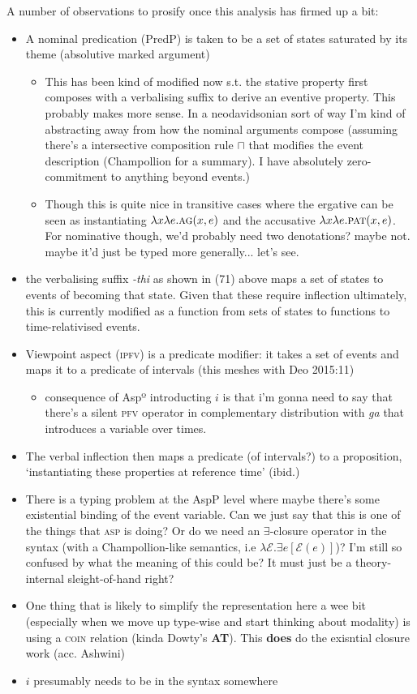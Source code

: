\documentclass[11pt,dvipsnames]{report}
\begin{document}
A number of observations to prosify once this analysis has firmed up a bit:
\begin{itemize}
	\item A nominal predication (PredP) is taken to be a set of states saturated by its theme (absolutive marked argument)
	\begin{itemize}
		\item This has been kind of modified now s.t. the stative property first composes with a verbalising suffix to derive an eventive property.  This probably makes more sense. In a neodavidsonian sort of way I'm kind of abstracting away from how the nominal arguments compose (assuming there's a intersective composition rule $ \boldsymbol\sqcap $ that modifies the event description (Champollion for a summary). I have absolutely zero-commitment to anything beyond events.)
		\item Though this is quite nice in transitive cases where the ergative can be seen as instantiating $ \lambda x\lambda e.\textsc{ag}(x,e) $ and the accusative $ \lambda x\lambda e.\textsc{pat}(x,e) $. For nominative though, we'd probably need two denotations? maybe not. maybe it'd just be typed more generally... let's see.
	\end{itemize}
	\item the verbalising suffix \textit{-thi} as shown in (71) above maps a set of states to events of becoming that state. Given that these require inflection ultimately, this is currently modified as a function from sets of states to functions to time-relativised events.
	\item Viewpoint aspect (\textsc{ipfv}) is a predicate modifier: it takes a set of events and maps it to a predicate of intervals (this meshes with Deo 2015:11)
	\begin{itemize}
		\item consequence of Aspº introducting $ i $ is that i'm gonna need to say that there's a silent \textsc{pfv} operator in complementary distribution with \textit{ga} that introduces a variable over times.
	\end{itemize}
	\item The verbal inflection then maps a predicate (of intervals?) to a proposition, `instantiating these properties at reference time' (ibid.)
	\item {\color{orange}There is a typing problem at the AspP level where maybe there's some existential binding of the event variable. Can we just say that this is one of the things that \textsc{asp} is doing? Or do we need an $ \exists $-closure operator in the syntax (with a Champollion-like semantics, i.e $ \lambda\mathcal E.\exists e[\mathcal E(e)] $)?} I'm still so confused by what the meaning of this could be? It must just be a theory-internal sleight-of-hand right?
	\item {\color{forest} One thing that is likely to simplify the representation here a wee bit (especially when we move up type-wise and start thinking about modality) is using a \textsc{coin} relation (kinda Dowty's \textbf{AT}). This \textbf{does} do the exisntial closure work (acc. Ashwini)}
	\item $ i $  presumably needs to be in the syntax somewhere
\end{itemize}
\end{document}
